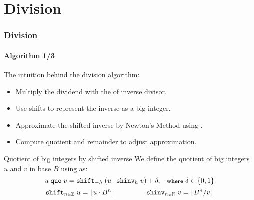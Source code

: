\section{Division}
\begin{frame}[fragile]
  \frametitle{Division}
  \framesubtitle{Algorithm 1/3}
  The intuition behind the division algorithm:
        \begin{itemize}\footnotesize
            \item Multiply the dividend with the of inverse divisor.
                \pause
              \item Use shifts to represent the inverse as a big integer.
                \pause
              \item Approximate the shifted inverse by Newton's Method using \cite{watt2023efficient}.
                \pause
              \item Compute quotient and remainder to adjust approximation.
              \end{itemize}\vspace*{0.6em}\pause

              \begin{block}{Quotient of big integers by shifted inverse}\scriptsize
              We define the quotient of big integers $u$ and $v$ in base $B$ using \cite{watt2023efficient} as:\vspace*{-0.3em}
              \begin{equation}
    \scriptsize
    u~\mathtt{quo}~v = \mathtt{shift}_{-h}~ (u \cdot \mathtt{shinv}_h~v) + \delta,\quad \textbf{where~} \delta \in \{0,1\}
  \end{equation}\vspace*{-1.5em}
              \begin{equation}\scriptsize
    \mathtt{shift}_{n\in\mathbb{Z}}~u = \lfloor u \cdot B^n \rfloor \qquad \qquad \quad ~\,\, \mathtt{shinv}_{n\in\mathbb{N}}~v = \lfloor B^{n}/ v \rfloor
  \end{equation}
  \end{block}
      \end{frame}

